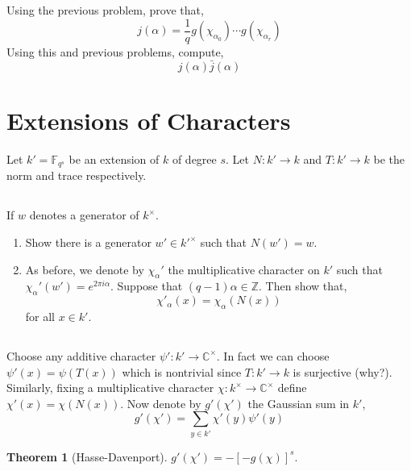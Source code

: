 \documentclass[12pt]{article}
\newcommand{\ZZ}{\mathbb{Z}}
\newcommand{\FF}{\mathbb{F}}
\newcommand{\CC}{\mathbb{C}}
\theoremstyle{remark}
\theoremstyle{definition}
\newtheorem{theorem}{Theorem}[subsection]
\begin{document}
\subsection{} \label{computing_j}

Using the previous problem, prove that,
\[ j(\alpha) = \frac{1}{q} g(\chi_{\alpha_0}) \cdots g(\chi_{\alpha_r}) \]
Using this and previous problems, compute,
\[ j(\alpha) \bar{j}(\alpha) \]


\section{Extensions of Characters}

Let $k' = \FF_{q^s}$ be an extension of $k$ of degree $s$. Let $N : k' \to k$ and $T : k' \to k$ be the norm and trace respectively.

\subsection{}

If $w$ denotes a generator of $k^\times$. 

\begin{enumerate}
\item Show there is a generator $w' \in k'^\times$ such that $N(w') = w$.

\item As before, we denote by $\chi_\alpha'$ the multiplicative character on $k'$ such that $\chi_{\alpha}'(w') = e^{2 \pi i \alpha}$. Suppose that $(q-1) \alpha \in \ZZ$. Then show that,
\[ \chi'_\alpha(x) = \chi_\alpha(N(x)) \]
for all $x \in k'$.
\end{enumerate}

\subsection{}

Choose any additive character $\psi' : k' \to \CC^\times$. In fact we can choose $\psi'(x) = \psi(T(x))$ which is nontrivial since $T : k' \to k$ is surjective (why?). Similarly, fixing a multiplicative character $\chi : k^\times \to \CC^\times$ define $\chi'(x) = \chi(N(x))$.  Now denote by $g'(\chi')$ the Gaussian sum in $k'$,
\[ g'(\chi') = \sum_{y \in k'} \chi'(y) \psi'(y) \]

\begin{theorem}[Hasse-Davenport]
$g'(\chi') = - [-g(\chi)]^s$.
\end{theorem}
\end{document}
